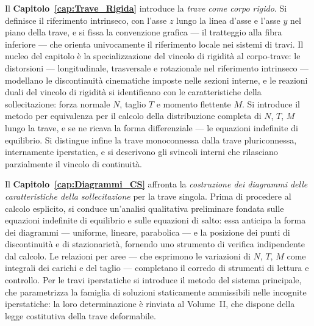 Il \textbf{Capitolo~\ref{cap:Trave_Rigida}} introduce la \emph{trave come corpo rigido}.
Si definisce il riferimento intrinseco, con l'asse $z$ lungo la linea d'asse e l'asse
$y$ nel piano della trave, e si fissa la convenzione grafica --- il tratteggio alla
fibra inferiore --- che orienta univocamente il riferimento locale nei sistemi di
travi. Il nucleo del capitolo è la specializzazione del vincolo di rigidità al
corpo-trave: le distorsioni --- longitudinale, trasversale e rotazionale nel riferimento
intrinseco --- modellano le discontinuità cinematiche imposte nelle sezioni interne, e
le reazioni duali del vincolo di rigidità si identificano con le caratteristiche della
sollecitazione: forza normale $N$, taglio $T$ e momento flettente $M$. Si introduce
il metodo per equivalenza per il calcolo della distribuzione completa di $N$, $T$, $M$
lungo la trave, e se ne ricava la forma differenziale --- le equazioni indefinite di
equilibrio. Si distingue infine la trave monoconnessa dalla trave pluriconnessa,
internamente iperstatica, e si descrivono gli svincoli interni che rilasciano
parzialmente il vincolo di continuità.

Il \textbf{Capitolo~\ref{cap:Diagrammi_CS}} affronta la \emph{costruzione dei diagrammi
	delle caratteristiche della sollecitazione} per la trave singola. Prima di procedere al
calcolo esplicito, si conduce un'analisi qualitativa preliminare fondata sulle equazioni
indefinite di equilibrio e sulle equazioni di salto: essa anticipa la forma dei
diagrammi --- uniforme, lineare, parabolica --- e la posizione dei punti di
discontinuità e di stazionarietà, fornendo uno strumento di verifica indipendente dal
calcolo. Le relazioni per aree --- che esprimono le variazioni di $N$, $T$, $M$ come
integrali dei carichi e del taglio --- completano il corredo di strumenti di lettura e
controllo. Per le travi iperstatiche si introduce il metodo del sistema principale, che
parametrizza la famiglia di soluzioni staticamente ammissibili nelle incognite
iperstatiche: la loro determinazione è rinviata al Volume~II, che dispone della legge
costitutiva della trave deformabile.

